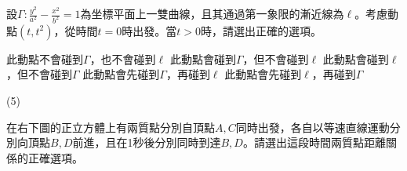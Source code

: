 \begin{QUESTIONS}
\begin{QUESTION}
    \begin{QEMPTYSPACE}
    \end{QEMPTYSPACE}
\end{QUESTION}
\begin{QUESTION}
    \begin{QBODY}
        設$\Gamma :\frac{{{y}^{2}}}{{{a}^{2}}}-\frac{{{x}^{2}}}{{{b}^{2}}}=1$為坐標平面上一雙曲線，且其通過第一象限的漸近線為$\ell $。考慮動點$(t,{{t}^{2}})$，從時間$t=0$時出發。當$t>0$時，請選出正確的選項。
        \begin{QOPS}
        \QOP 此動點不會碰到$\Gamma $，也不會碰到$\ell $
        \QOP 此動點會碰到$\Gamma $，但不會碰到$\ell $
        \QOP 此動點會碰到$\ell $，但不會碰到$\Gamma $
        \QOP 此動點會先碰到$\Gamma $，再碰到$\ell $
        \QOP 此動點會先碰到$\ell $，再碰到$\Gamma $
        \end{QOPS}
    \end{QBODY}
    \begin{QFROMS}
    \end{QFROMS}
    \begin{QTAGS}
    \end{QTAGS}
    \begin{QANS}
        (5)
    \end{QANS}
    \begin{QSOL}
    \end{QSOL}
    \begin{QEMPTYSPACE}
    \end{QEMPTYSPACE}
\end{QUESTION}
\begin{QUESTION}
    \begin{QBODY}
        在右下圖的正立方體上有兩質點分別自頂點$A,C$同時出發，各自以等速直線運動分別向頂點$B,D$前進，且在1秒後分別同時到達$B,D$。請選出這段時間兩質點距離關係的正確選項。
        
\end{QBODY}
\end{QUESTION}
\end{QUESTIONS}
